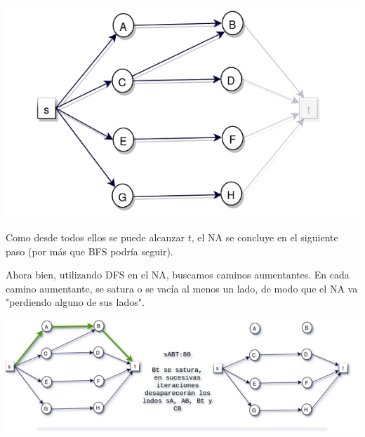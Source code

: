 \documentclass[10pt,a4paper]{article}
\begin{document}
\begin{center}

    \begin{adjustbox}{max size={\textwidth}{\textheight}}
        \includegraphics{definitions/D3.jpg}
        \end{adjustbox}
    
\end{center}

Como desde todos ellos se puede alcanzar $t$, el NA se concluye en el siguiente paso (por más que BFS podría seguir).

Ahora bien, utilizando DFS en el NA, buscamos caminos aumentantes. En cada camino aumentante, se satura o se vacía al menos un lado, de modo que el NA va "perdiendo alguno de sus lados".

\begin{center}

    \begin{adjustbox}{max size={\textwidth}{\textheight}}
        \includegraphics{definitions/dinic_ej_a.jpg}
        \end{adjustbox}
    
\end{center}
\end{document}
